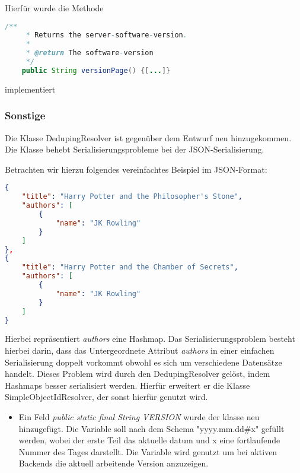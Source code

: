 Hierfür wurde die Methode
\begin{lstlisting}[language=java]
    /**
     * Returns the server-software-version.
     * 
     * @return The software-version
     */
    public String versionPage() {[...]}
\end{lstlisting}
implementiert



\subsubsection{Sonstige}
Die Klasse DedupingResolver ist gegenüber dem Entwurf neu hinzugekommen.
\\
Die Klasse behebt Serialisierungsprobleme bei der \gls{JSON}-Serialisierung.

Betrachten wir hierzu folgendes vereinfachtes Beispiel im \gls{JSON}-Format:
\begin{lstlisting}[frame=single, language=json]
{
    "title": "Harry Potter and the Philosopher's Stone",
    "authors": [
        {
            "name": "JK Rowling"
        }
    ]
},
{
    "title": "Harry Potter and the Chamber of Secrets",
    "authors": [
        {
            "name": "JK Rowling"
        }
    ]
}
\end{lstlisting}
Hierbei repräsentiert \textit{authors} eine Hashmap.
Das Serialisierungsproblem besteht hierbei darin, dass das Untergeordnete Attribut \textit{authors} in einer einfachen Serialisierung doppelt vorkommt obwohl es sich um verschiedene Datensätze handelt.
Dieses Problem wird durch den DedupingResolver gelöst, indem Hashmaps besser serialisiert werden.
Hierfür erweitert er die Klasse SimpleObjectIdResolver, der sonst hierfür genutzt wird.
\noChange
{}
\begin{itemize}[noitemsep]
    \item Ein Feld \textit{public static final String VERSION} wurde der klasse neu hinzugefügt. Die Variable soll nach dem Schema "yyyy.mm.dd\#x" gefüllt werden, wobei der erste Teil das aktuelle datum und x eine fortlaufende Nummer des Tages darstellt. Die Variable wird genutzt um bei aktiven Backends die aktuell arbeitende Version anzuzeigen.
\end{itemize}